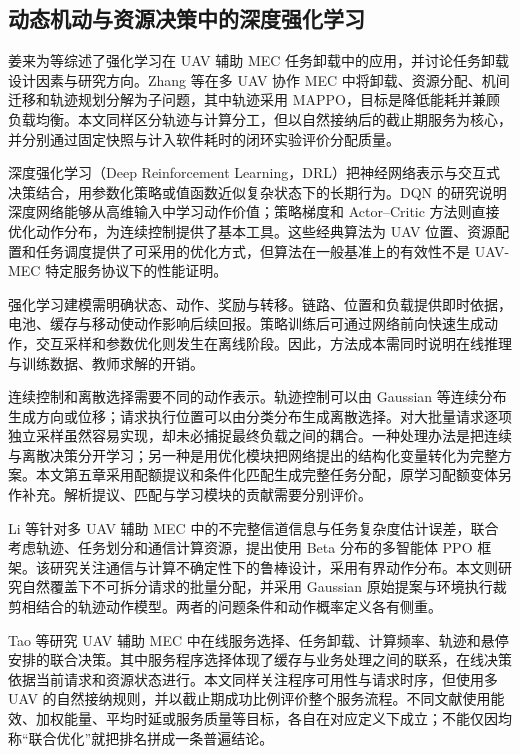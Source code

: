 \subsection{动态机动与资源决策中的深度强化学习}
\label{sec:ch1-drl-related}

姜来为等综述了强化学习在 UAV 辅助 MEC 任务卸载中的应用，并讨论任务卸载设计因素与研究方向\cite{jiang2026survey}。Zhang 等在多 UAV 协作 MEC 中将卸载、资源分配、机间迁移和轨迹规划分解为子问题，其中轨迹采用 MAPPO，目标是降低能耗并兼顾负载均衡\cite{zhang2026loadbalance}。本文同样区分轨迹与计算分工，但以自然接纳后的截止期服务为核心，并分别通过固定快照与计入软件耗时的闭环实验评价分配质量。


深度强化学习（Deep Reinforcement Learning，DRL）把神经网络表示与交互式决策结合，用参数化策略或值函数近似复杂状态下的长期行为。DQN 的研究说明深度网络能够从高维输入中学习动作价值\cite{mnih2015human}；策略梯度和 Actor--Critic 方法则直接优化动作分布，为连续控制提供了基本工具\cite{williams1992simple,lillicrap2016continuous}。这些经典算法为 UAV 位置、资源配置和任务调度提供了可采用的优化方式，但算法在一般基准上的有效性不是 UAV-MEC 特定服务协议下的性能证明。

强化学习建模需明确状态、动作、奖励与转移。链路、位置和负载提供即时依据，电池、缓存与移动使动作影响后续回报。策略训练后可通过网络前向快速生成动作，交互采样和参数优化则发生在离线阶段。因此，方法成本需同时说明在线推理与训练数据、教师求解的开销。

连续控制和离散选择需要不同的动作表示。轨迹控制可以由 Gaussian 等连续分布生成方向或位移；请求执行位置可以由分类分布生成离散选择。对大批量请求逐项独立采样虽然容易实现，却未必捕捉最终负载之间的耦合。一种处理办法是把连续与离散决策分开学习；另一种是用优化模块把网络提出的结构化变量转化为完整方案。本文第五章采用配额提议和条件化匹配生成完整任务分配，原学习配额变体另作补充。解析提议、匹配与学习模块的贡献需要分别评价。

Li 等针对多 UAV 辅助 MEC 中的不完整信道信息与任务复杂度估计误差，联合考虑轨迹、任务划分和通信计算资源，提出使用 Beta 分布的多智能体 PPO 框架\cite{zhao2024robust}。该研究关注通信与计算不确定性下的鲁棒设计，采用有界动作分布。本文则研究自然覆盖下不可拆分请求的批量分配，并采用 Gaussian 原始提案与环境执行裁剪相结合的轨迹动作模型。两者的问题条件和动作概率定义各有侧重。

Tao 等研究 UAV 辅助 MEC 中在线服务选择、任务卸载、计算频率、轨迹和悬停安排的联合决策\cite{tao2026online}。其中服务程序选择体现了缓存与业务处理之间的联系，在线决策依据当前请求和资源状态进行。本文同样关注程序可用性与请求时序，但使用多 UAV 的自然接纳规则，并以截止期成功比例评价整个服务流程。不同文献使用能效、加权能量、平均时延或服务质量等目标，各自在对应定义下成立；不能仅因均称“联合优化”就把排名拼成一条普遍结论。

